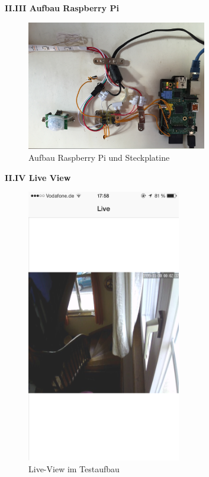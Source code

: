 \textbf{II.III Aufbau Raspberry Pi}\\
\begin{figure}[h]
	\begin{minipage}{0.7\textwidth}
		\centering
		\includegraphics[width=0.7\textwidth]{./data/praxis1.jpg}
		\caption{Aufbau Raspberry Pi und Steckplatine}
	\end{minipage}
\end{figure}

\textbf{II.IV Live View}\\
\begin{figure}[h]
	\begin{minipage}{0.6\textwidth}
		\centering
		\includegraphics[width=0.6\textwidth]{./data/praxis3.jpg}
		\caption{Live-View im Testaufbau}
	\end{minipage}
\end{figure}
\clearpage
\pagebreak

